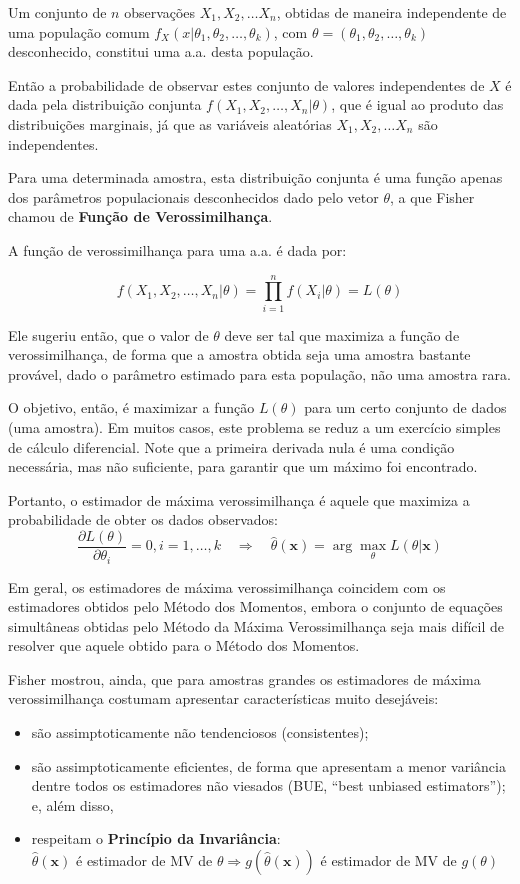 \documentclass[
]{book}
\providecommand{\tightlist}{%
  \setlength{\itemsep}{0pt}\setlength{\parskip}{0pt}}
\theoremstyle{definition}
\theoremstyle{definition}
\theoremstyle{definition}
\theoremstyle{remark}
\begin{document}
Um conjunto de \(n\) observações \(X_1, X_2,\ldots X_n\), obtidas de maneira independente de uma população comum \(f_X(x| \theta_1, \theta_2, \ldots, \theta_k)\), com \(\theta = (\theta_1, \theta_2, \ldots, \theta_k)\) desconhecido, constitui uma a.a. desta população.

Então a probabilidade de observar estes conjunto de valores independentes de \(X\) é dada pela distribuição conjunta \(f(X_1, X_2, \ldots, X_n|\theta)\), que é igual ao produto das distribuições marginais, já que as variáveis aleatórias \(X_1, X_2, \ldots X_n\) são independentes.

Para uma determinada amostra, esta distribuição conjunta é uma função apenas dos parâmetros populacionais desconhecidos dado pelo vetor \(\theta\), a que Fisher chamou de \textbf{Função de Verossimilhança}.

A função de verossimilhança para uma a.a. é dada por:

\[f(X_1, X_2, \ldots, X_n| \theta) = \prod_{i = 1}^{n} f(X_i| \theta) = L(\theta)\]

Ele sugeriu então, que o valor de \(\theta\) deve ser tal que maximiza a função de verossimilhança, de forma que a amostra obtida seja uma amostra bastante provável, dado o parâmetro estimado para esta população, não uma amostra rara.

O objetivo, então, é maximizar a função \(L(\theta)\) para um certo conjunto de dados (uma amostra). Em muitos casos, este problema se reduz a um exercício simples de cálculo diferencial. Note que a primeira derivada nula é uma condição necessária, mas não suficiente, para garantir que um máximo foi encontrado.

Portanto, o estimador de máxima verossimilhança é aquele que maximiza a probabilidade de obter os dados observados:
\[\frac{\partial L(\theta)}{\partial \theta_i}=0, i = 1, \ldots, k \quad \Rightarrow \quad  \hat\theta(\mathbf{x}) = \arg \underset{\theta}{\max} L(\theta|\mathbf{x})\]

Em geral, os estimadores de máxima verossimilhança coincidem com os estimadores obtidos pelo Método dos Momentos, embora o conjunto de equações simultâneas obtidas pelo Método da Máxima Verossimilhança seja mais difícil de resolver que aquele obtido para o Método dos Momentos.

Fisher mostrou, ainda, que para amostras grandes os estimadores de máxima verossimilhança costumam apresentar características muito desejáveis:

\begin{itemize}
\tightlist
\item
  são assimptoticamente não tendenciosos (consistentes);\\
\item
  são assimptoticamente eficientes, de forma que apresentam a menor variância dentre todos os estimadores não viesados (BUE, ``best unbiased estimators''); e, além disso,
\item
  respeitam o \textbf{Princípio da Invariância}:\\
  \(\hat\theta(\mathbf{x})\) é estimador de MV de \(\theta \Rightarrow g(\hat\theta(\mathbf{x}))\) é estimador de MV de \(g(\theta)\)
\end{itemize}
\end{document}
